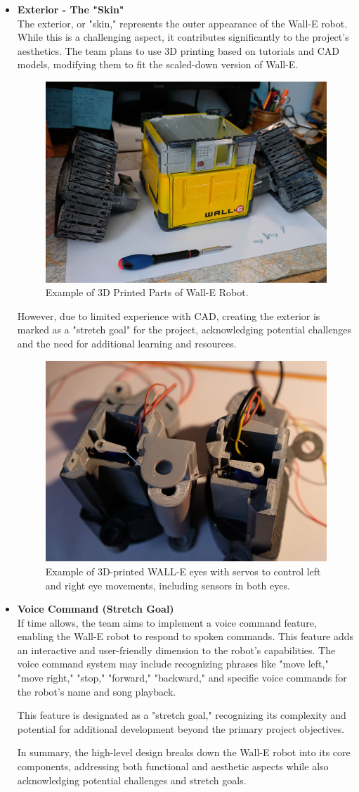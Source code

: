 \documentclass[12pt]{article}
\begin{document}
\begin{itemize}
    \item \textbf{Exterior - The "Skin"}\\
    The exterior, or "skin," represents the outer appearance of the Wall-E robot. While this is a challenging aspect, it contributes significantly to the project's aesthetics. The team plans to use 3D printing based on tutorials and CAD models, modifying them to fit the scaled-down version of Wall-E.
    \begin{figure}[H]
        \centering
        \includegraphics[width=0.5\linewidth]{Assembly_Body_and_Wheels.jpg}
        \caption{Example of 3D Printed Parts of Wall-E Robot.}
    \end{figure}
    However, due to limited experience with CAD, creating the exterior is marked as a "stretch goal" for the project, acknowledging potential challenges and the need for additional learning and resources.
    \begin{figure}[H]
        \centering
        \includegraphics[width=0.5\linewidth]{Assembly_Eyes_Servos.jpg}
        \caption{Example of 3D-printed WALL-E eyes with servos to control left and right eye movements, including sensors in both eyes.}
    \end{figure}

    \item \textbf{Voice Command (Stretch Goal)}\\
    If time allows, the team aims to implement a voice command feature, enabling the Wall-E robot to respond to spoken commands. This feature adds an interactive and user-friendly dimension to the robot's capabilities. The voice command system may include recognizing phrases like "move left," "move right," "stop," "forward," "backward," and specific voice commands for the robot's name and song playback.
    
    This feature is designated as a "stretch goal," recognizing its complexity and potential for additional development beyond the primary project objectives.
    
    In summary, the high-level design breaks down the Wall-E robot into its core components, addressing both functional and aesthetic aspects while also acknowledging potential challenges and stretch goals.
\end{itemize}
\end{document}
